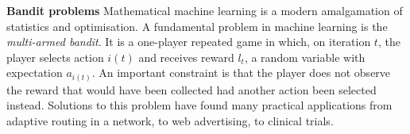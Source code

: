 %
%
\textbf{Bandit problems}
Mathematical machine learning is a modern amalgamation of statistics %
and optimisation. %
A fundamental problem in machine learning is the \textit{multi-armed bandit}. It is a one-player repeated game in which, on iteration $t$, the player selects action $i(t)$ and receives reward $l_t$, a random variable with expectation $a_{i(t)}$.  An important constraint is that the player does not observe the reward that would have been collected had another action been selected instead.  Solutions to this problem have found many practical applications from adaptive routing in a network, to web advertising, to clinical trials\cite{bubeck2012regret}.

